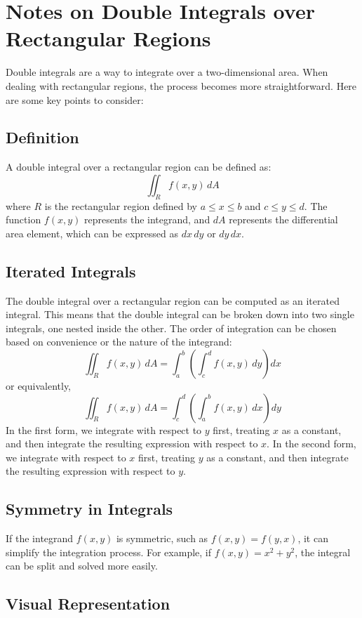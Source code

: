 \documentclass{article}
\begin{document}
\section*{Notes on Double Integrals over Rectangular Regions}

Double integrals are a way to integrate over a two-dimensional area. When dealing with rectangular regions, the process becomes more straightforward. Here are some key points to consider:

\subsection*{Definition}
A double integral over a rectangular region can be defined as:
\[
\iint_R f(x, y) \, dA
\]
where \( R \) is the rectangular region defined by \( a \leq x \leq b \) and \( c \leq y \leq d \). The function \( f(x, y) \) represents the integrand, and \( dA \) represents the differential area element, which can be expressed as \( dx \, dy \) or \( dy \, dx \).

\subsection*{Iterated Integrals}
The double integral over a rectangular region can be computed as an iterated integral. This means that the double integral can be broken down into two single integrals, one nested inside the other. The order of integration can be chosen based on convenience or the nature of the integrand:
\[
\iint_R f(x, y) \, dA = \int_a^b \left( \int_c^d f(x, y) \, dy \right) dx
\]
or equivalently,
\[
\iint_R f(x, y) \, dA = \int_c^d \left( \int_a^b f(x, y) \, dx \right) dy
\]
In the first form, we integrate with respect to \( y \) first, treating \( x \) as a constant, and then integrate the resulting expression with respect to \( x \). In the second form, we integrate with respect to \( x \) first, treating \( y \) as a constant, and then integrate the resulting expression with respect to \( y \).

\subsection*{Symmetry in Integrals}
If the integrand \( f(x, y) \) is symmetric, such as \( f(x, y) = f(y, x) \), it can simplify the integration process. For example, if \( f(x, y) = x^2 + y^2 \), the integral can be split and solved more easily.

\subsection*{Visual Representation}
\begin{center}
\end{center}
\end{document}

